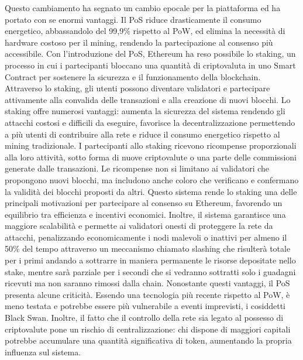 Questo cambiamento ha segnato un cambio epocale per la piattaforma ed ha portato con se enormi vantaggi.
Il PoS riduce drasticamente il consumo energetico, abbassandolo del 99,9\% rispetto al PoW, ed elimina la necessità di hardware costoso per il mining, rendendo la partecipazione al consenso più accessibile.
Con l’introduzione del PoS, Ethereum ha reso possibile lo staking, un processo in cui i partecipanti bloccano una quantità di criptovaluta in uno Smart Contract per sostenere la sicurezza e il funzionamento della blockchain. Attraverso lo staking, gli utenti possono diventare validatori e partecipare attivamente alla convalida delle transazioni e alla creazione di nuovi blocchi.
Lo staking offre numerosi vantaggi: aumenta la sicurezza del sistema rendendo gli attacchi costosi e difficili da eseguire, favorisce la decentralizzazione permettendo a più utenti di contribuire alla rete e riduce il consumo energetico rispetto al mining tradizionale. I partecipanti allo staking ricevono ricompense proporzionali alla loro attività, sotto forma di nuove criptovalute o una parte delle commissioni generate dalle transazioni.
Le ricompense non si limitano ai validatori che propongono nuovi blocchi, ma includono anche coloro che verificano e confermano la validità dei blocchi proposti da altri. Questo sistema rende lo staking una delle principali motivazioni per partecipare al consenso su Ethereum, favorendo un equilibrio tra efficienza e incentivi economici.
Inoltre, il sistema garantisce una maggiore scalabilità e permette ai validatori onesti di proteggere la rete da attacchi, penalizzando economicamente i nodi malevoli o inattivi per almeno il 50\% del tempo attraverso un meccanismo chiamato slashing che risulterà totale per i primi andando a sottrarre in maniera permanente le risorse depositate nello stake, mentre sarà parziale per i secondi che si vedranno sottratti solo i guadagni ricevuti ma non saranno rimossi dalla chain.
Nonostante questi vantaggi, il PoS presenta alcune criticità. Essendo una tecnologia più recente rispetto al PoW, è meno testata e potrebbe essere più vulnerabile a eventi imprevisti, i cosiddetti Black Swan. Inoltre, il fatto che il controllo della rete sia legato al possesso di criptovalute pone un rischio di centralizzazione: chi dispone di maggiori capitali potrebbe accumulare una quantità significativa di token, aumentando la propria influenza sul sistema.
